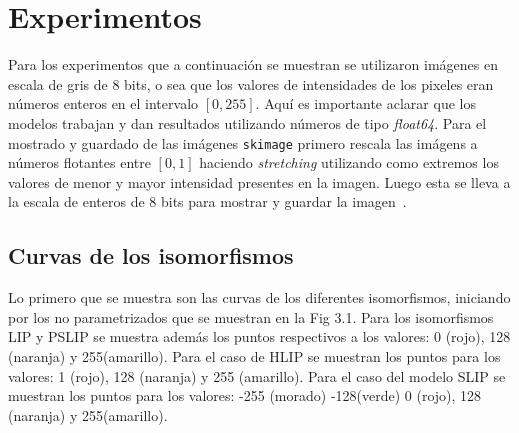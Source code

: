 \section{Experimentos}
Para los experimentos que a continuaci\'on se muestran se utilizaron im\'agenes en escala de gris de 8 bits, o sea que los valores de intensidades de los pixeles eran n\'umeros enteros en el intervalo $[0,255]$. Aqu\'i es importante aclarar que los modelos trabajan y dan resultados utilizando n\'umeros de tipo \textit{float64}. Para el mostrado y guardado de las im\'agenes \verb|skimage| primero rescala las im\'agens a n\'umeros flotantes entre $[0,1]$ haciendo \textit{stretching} utilizando como extremos los valores de menor y mayor intensidad presentes en la imagen. Luego esta se lleva a la escala de enteros de 8 bits para mostrar y guardar la imagen~\cite{image_data_types_and_what_they_mean}.

\subsection{Curvas de los isomorfismos}
Lo primero que se muestra son las curvas de los diferentes isomorfismos, iniciando por los no parametrizados que se muestran en la Fig 3.1. Para los isomorfismos LIP y PSLIP se muestra adem\'as los puntos respectivos a los valores: 0 (rojo), 128 (naranja) y 255(amarillo). Para el caso de HLIP se muestran los puntos para los valores: 1 (rojo), 128 (naranja) y 255 (amarillo). Para el caso del modelo SLIP se muestran los puntos para los valores: -255 (morado) -128(verde) 0 (rojo), 128 (naranja) y 255(amarillo).

